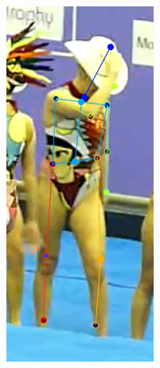 \begin{figure}[t!]
\begin{subfigure}[b]{0.115\textwidth}
            \includegraphics[width=\textwidth]{resources/MotivativeAnnotation/MPII/bad_anno-1}

\end{subfigure}
\end{figure}
